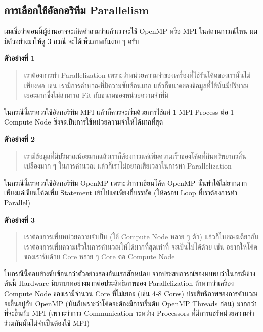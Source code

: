 \subsection{การเลือกใช้อัลกอริทึม Parallelism}

ผมเชื่อว่าตอนนี้ผู้อ่านอาจจะเกิดคำถามว่าแล้วเราจะใช้ OpenMP หรือ MPI ในสถานการณ์ไหน ผมมีตัวอย่างมาให้ดู 3 กรณี จะได้เห็นภาพกันง่าย ๆ ครับ

\noindent \textbf{ตัวอย่างที่ 1}

\begin{quote}
  \color{gray}
  เราต้องการทำ Parallelization เพราะว่าหน่วยความจำของเครื่องที่ใช้รันโค้ดของเรานั้นไม่เพียงพอ เช่น เรามีการคำนวณที่มีความซับซ้อนมาก
  แล้วก็ขนาดของข้อมูลที่ใช้นั้นมีปริมาณเยอะมากซึ่งไม่สามารถ Fit กับขนาดของหน่วยความจำที่มี
\end{quote}

ในกรณีนี้เราควรใช้อัลกอริทึม MPI แล้วก็ควรจะเริ่มด้วยการใช้แค่ 1 MPI Process ต่อ 1 Compute Node ซึ่งจะเป็นการใช้หน่วยความจำให้ได้มากที่สุด

\noindent \textbf{ตัวอย่างที่ 2}

\begin{quote}
  \color{gray}
  เรามีข้อมูลที่มีปริมาณน้อยมากแล้วเราก็ต้องการแค่เพิ่มความเร็วของโค้ดที่กินทรัพยากรสิ้นเปลืองมาก ๆ ในการคำนวณ แล้วก็เราไม่อยากเสียเวลาในการทำ
  Parallelization
\end{quote}

ในกรณีนี้เราควรใช้อัลกอริทึม OpenMP เพราะว่าการเขียนโค้ด OpenMP นั้นทำได้ไม่ยากมาก เพียงแค่เขียนโค้ดเพิ่ม Statement เข้าไปแค่เพียงกี่บรรทัด
(ให้ครอบ Loop ที่เราต้องการทำ Parallel)

\noindent \textbf{ตัวอย่างที่ 3}

\begin{quote}
  \color{gray}
  เราต้องการเพิ่มหน่วยความจำเป็น (ใช้ Compute Node หลาย ๆ ตัว) แล้วก็ในขณะเดียวกันเราต้องการเพิ่มความเร็วในการคำนวณให้ได้มากที่สุดเท่าที่%
  จะเป็นไปได้ด้วย เช่น อยากให้โค้ดของเรารันด้วย Core หลาย ๆ Core ต่อ Compute Node
\end{quote}

ในกรณีนี้ค่อนข้างซับซ้อนกว่าตัวอย่างสองอันแรกสักหน่อย จากประสบการณ์ของผมพบว่าในกรณีข้างต้นนี้ Hardware มีบทบาทอย่างมากต่อประสิทธิภาพของ
Parallelization ถ้าหากว่าเครื่อง Compute Node ของเรามีจำนวน Core ที่ไม่เยอะ (เช่น 4-8 Cores) ประสิทธิภาพของการคำนวณจะขึ้นอยู่กับ
OpenMP (นั่นก็เพราะว่าโค้ดจะต้องมีการเริ่มต้น OpenMP Threads ก่อน) มากกว่าที่จะขึ้นกับ MPI (เพราะว่าการ Communication ระหว่าง Processors
ที่มีการแชร์หน่วยความจำร่วมกันนั้นไม่จำเป็นต้องใช้ MPI)

